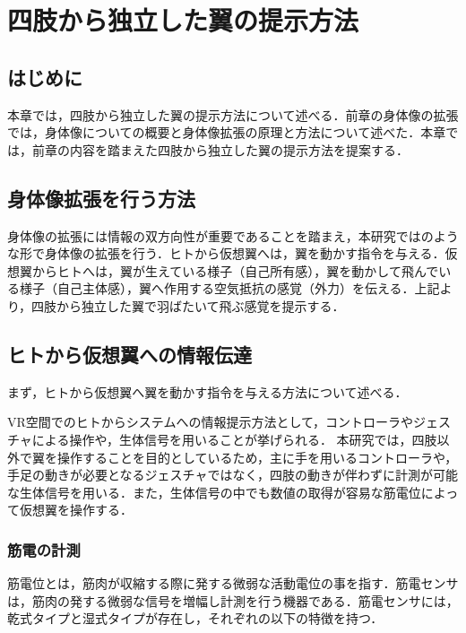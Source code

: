 \chapter[四肢から独立した翼の提示方法]%
        {四肢から独立した翼の提示方法}

\section{はじめに}
    本章では，四肢から独立した翼の提示方法について述べる．前章の身体像の拡張では，身体像についての概要と身体像拡張の原理と方法について述べた．本章では，前章の内容を踏まえた四肢から独立した翼の提示方法を提案する．


\section{身体像拡張を行う方法}
    身体像の拡張には情報の双方向性が重要であることを踏まえ，本研究ではのような形で身体像の拡張を行う．ヒトから仮想翼へは，翼を動かす指令を与える．仮想翼からヒトへは，翼が生えている様子（自己所有感），翼を動かして飛んでいる様子（自己主体感），翼へ作用する空気抵抗の感覚（外力）を伝える．上記より，四肢から独立した翼で羽ばたいて飛ぶ感覚を提示する．
    
\section{ヒトから仮想翼への情報伝達}
    まず，ヒトから仮想翼へ翼を動かす指令を与える方法について述べる．

    VR空間でのヒトからシステムへの情報提示方法として，コントローラやジェスチャによる操作や，生体信号を用いることが挙げられる．
    本研究では，四肢以外で翼を操作することを目的としているため，主に手を用いるコントローラや，手足の動きが必要となるジェスチャではなく，四肢の動きが伴わずに計測が可能な生体信号を用いる．また，生体信号の中でも数値の取得が容易な筋電位によって仮想翼を操作する．
    
    \subsection{筋電の計測}
        筋電位とは，筋肉が収縮する際に発する微弱な活動電位の事を指す．筋電センサは，筋肉の発する微弱な信号を増幅し計測を行う機器である\cite{alts-myography}．筋電センサには，乾式タイプと湿式タイプが存在し，それぞれの以下の特徴を持つ．


